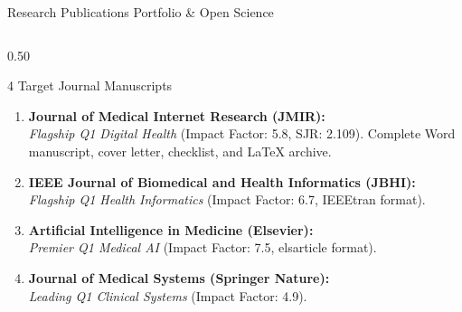 \documentclass[aspectratio=169, 10pt]{beamer}
\begin{document}
\begin{frame}{Research Publications Portfolio \& Open Science}
    \begin{columns}[t]
        \begin{column}{0.50\textwidth}
            \begin{block}{4 Target Journal Manuscripts}
                \scriptsize
                \begin{enumerate}
                    \item \textbf{Journal of Medical Internet Research (JMIR):} \\
                    \textit{Flagship Q1 Digital Health} (Impact Factor: 5.8, SJR: 2.109). Complete Word manuscript, cover letter, checklist, and LaTeX archive.
                    \item \textbf{IEEE Journal of Biomedical and Health Informatics (JBHI):} \\
                    \textit{Flagship Q1 Health Informatics} (Impact Factor: 6.7, IEEEtran format).
                    \item \textbf{Artificial Intelligence in Medicine (Elsevier):} \\
                    \textit{Premier Q1 Medical AI} (Impact Factor: 7.5, elsarticle format).
                    \item \textbf{Journal of Medical Systems (Springer Nature):} \\
                    \textit{Leading Q1 Clinical Systems} (Impact Factor: 4.9).
                \end{enumerate}
            \end{block}
        \end{column}
        

\end{columns}
\end{frame}
\end{document}
